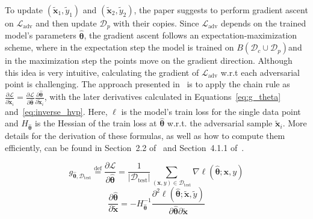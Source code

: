 To update $(\tilde{\mathbf{x}}_1, \tilde{y}_1)$ and $(\tilde{\mathbf{x}}_2, \tilde{y}_2)$, the paper suggests to perform gradient ascent on $\mathcal{L}_{\mathrm{adv}}$ and then update $\mathcal{D}_p$ with their copies. Since $\mathcal{L}_{\mathrm{adv}}$ depends on the trained model's parameters $\hat{\boldsymbol{\theta}}$, the gradient ascent follows an expectation-maximization scheme, where in the expectation step the model is trained on $B(\mathcal{D}_c \cup \mathcal{D}_p)$\footnotemark and in the maximization step the points move on the gradient direction. Although this idea is very intuitive, calculating the gradient of $\mathcal{L}_{\mathrm{adv}}$ w.r.t each adversarial point is challenging. The approach presented in~\cite{koh2018} is to apply the chain rule as $\frac{\partial \mathcal{L}}{\partial \tilde{\mathbf{x}}_i} = \frac{\partial \mathcal{L}}{\partial \hat{\boldsymbol{\theta}}} \frac{\partial \hat{\boldsymbol{\theta}}}{\partial \tilde{\mathbf{x}}_i}$, with the later derivatives calculated in Equations~\ref{eq:g_theta} and~\ref{eq:inverse_hvp}. Here, $\ell$ is the model's train loss for the single data point and $H_{\hat{\boldsymbol{\theta}}}$ is the Hessian of the train loss at $\hat{\boldsymbol{\theta}}$ w.r.t. the adversarial sample $\tilde{\mathbf{x}}_i$. More details for the derivation of these formulas, as well as how to compute them efficiently, can be found in Section~2.2 of~\cite{koh2017} and Section~4.1.1 of~\cite{koh2018}.


\begin{equation}
    g_{\hat{\boldsymbol{\theta}}, \mathcal{D}_{\text{test}}} \overset{\operatorname{def}}{=}
    \dfrac{\partial \mathcal{L}}{\partial \hat{\boldsymbol{\theta}}} =
    \dfrac{1}{| \mathcal{D}_\text{test} |}
    \sum_{(\mathbf{x},y) \in \mathcal{D}_\text{test}} \nabla \ell(\hat{\boldsymbol{\theta}}; \mathbf{x},y)
    \label{eq:g_theta}
\end{equation}
\begin{equation}
    \dfrac{\partial \hat{\boldsymbol{\theta}}}{\partial \tilde{\mathbf{x}}} =
    - H_{\hat{\boldsymbol{\theta}}}^{-1}
    \dfrac{\partial^2 \ell(\hat{\boldsymbol{\theta}};\tilde{\mathbf{x}}, \tilde{y})}{\partial \hat{\boldsymbol{\theta}} \partial \tilde{\mathbf{x}}}
    \label{eq:inverse_hvp}
\end{equation}

